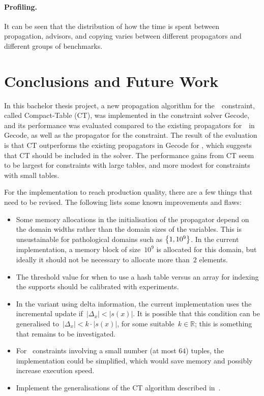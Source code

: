 \documentclass[a4paper,11pt]{article}
\theoremstyle{definition}
\newcommand{\Table}{\Constraint{Table}}
\numberwithin{equation}{section}
\begin{document}
\paragraph{Profiling.}
It can be seen that the distribution of how the time is spent between propagation, advisors,
and copying varies between different propagators and different groups of benchmarks.
\section{Conclusions and Future Work}
\label{conclusions}

In this bachelor thesis project, a new propagation algorithm for the~\Table~constraint,
called Compact-Table (CT), was implemented in the constraint solver Gecode, and its performance
was evaluated compared to the existing propagators for~\Table~in Gecode, as well
as the propagator for the  constraint.
The result of the evaluation is that CT outperforms the existing propagators
in Gecode for \Table, which suggests that CT should be included in the solver.
The performance gains from CT seem to be largest for constraints with large tables,
and more modest for constraints with small tables.

For the implementation to reach production quality, there
are a few things that need to be revised. The following lists some known
improvements and flaws:

\begin{itemize}

  \item Some memory allocations in the initialisation of the propagator
    depend on the domain widths rather
    than the domain sizes of the variables. This is unsustainable
    for pathological domains such as $\left\{1, 10^9\right\}$. In the current
    implementation, a memory block of size~$10^9$ is allocated for this
    domain, but ideally it should not be necessary to allocate more than~$2$
    elements.

  \item The threshold value for when to use a hash table versus
    an array for indexing the supports should be calibrated with
    experiments.

  \item In the variant using delta information, the current implementation
    uses the incremental update if~$|\Delta_x| < |s(x)|$. It is possible
    that this condition can be generalised to~$|\Delta_x| < k \cdot |s(x)|$,
    for some suitable~$k \in \mathbb{R}$; this is something that remains
    to be investigated.

  \item For \Table~constraints involving a small number (at most $64$)
    tuples, the implementation could be simplified, which would save
    memory and possibly increase execution speed.

  \item Implement the generalisations of the CT algorithm described
    in~\cite{DBLP:conf/aaai/VerhaegheLS17}.

\end{itemize}
\end{document}

